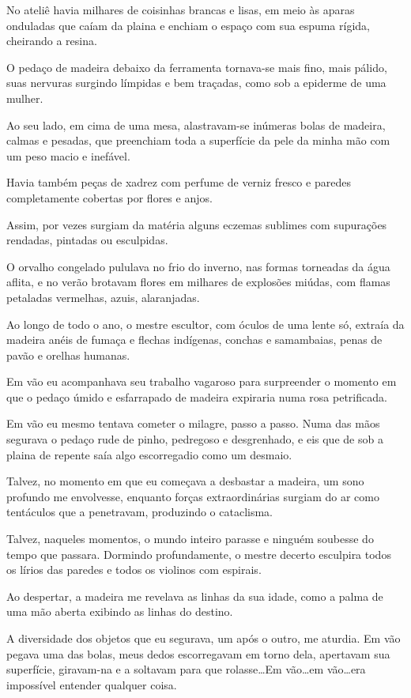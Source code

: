 No ateliê havia milhares de coisinhas brancas e lisas, em meio às aparas onduladas que caíam da plaina e enchiam o espaço com sua espuma rígida, cheirando a resina.

O pedaço de madeira debaixo da ferramenta tornava-se mais fino, mais pálido, suas nervuras surgindo límpidas e bem traçadas, como sob a epiderme de uma mulher. 

Ao seu lado, em cima de uma mesa, alastravam-se inúmeras bolas de madeira, calmas e pesadas, que preenchiam toda a superfície da pele da minha mão com um peso macio e inefável.

Havia também peças de xadrez com perfume de verniz fresco e paredes completamente cobertas por flores e anjos.

Assim, por vezes surgiam da matéria alguns eczemas sublimes com supurações rendadas, pintadas ou esculpidas.

O orvalho congelado pululava no frio do inverno, nas formas torneadas da água aflita, e no verão brotavam flores em milhares de explosões miúdas, com flamas petaladas vermelhas, azuis, alaranjadas. 

Ao longo de todo o ano, o mestre escultor, com óculos de uma lente só, extraía da madeira anéis de fumaça e flechas indígenas, conchas e samambaias, penas de pavão e orelhas humanas.

Em vão eu acompanhava seu trabalho vagaroso para surpreender o momento em que o pedaço úmido e esfarrapado de madeira expiraria numa rosa petrificada.

Em vão eu mesmo tentava cometer o milagre, passo a passo. Numa das mãos segurava o pedaço rude de pinho, pedregoso e desgrenhado, e eis que de sob a plaina de repente saía algo escorregadio como um desmaio.

Talvez, no momento em que eu começava a desbastar a madeira, um sono profundo me envolvesse, enquanto forças extraordinárias surgiam do ar como tentáculos que a penetravam, produzindo o cataclisma.

Talvez, naqueles momentos, o mundo inteiro parasse e ninguém soubesse do tempo que passara. Dormindo profundamente, o mestre decerto esculpira todos os lírios das paredes e todos os violinos com espirais.

Ao despertar, a madeira me revelava as linhas da sua idade, como a palma de uma mão aberta exibindo as linhas do destino.

A diversidade dos objetos que eu segurava, um após o outro, me aturdia. Em vão pegava uma das bolas, meus dedos escorregavam em torno dela, apertavam sua superfície, giravam-na e a soltavam para que rolasse\dots Em vão\dots em vão\dots era impossível entender qualquer coisa.

